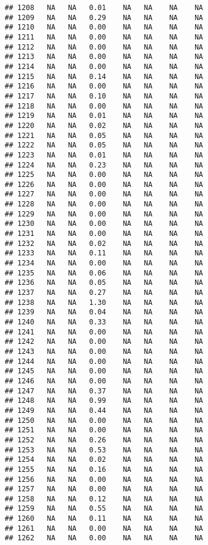 \documentclass{article}\usepackage{graphicx, color}
\makeatletter
\newenvironment{kframe}{%
 \def\at@end@of@kframe{}%
 \ifinner\ifhmode%
  \def\at@end@of@kframe{\end{minipage}}%
  \begin{minipage}{\columnwidth}%
 \fi\fi%
 \def\FrameCommand##1{\hskip\@totalleftmargin \hskip-\fboxsep
 \colorbox{shadecolor}{##1}\hskip-\fboxsep
     \hskip-\linewidth \hskip-\@totalleftmargin \hskip\columnwidth}%
 \MakeFramed {\advance\hsize-\width
   \@totalleftmargin\z@ \linewidth\hsize
   \@setminipage}}%
 {\par\unskip\endMakeFramed%
 \at@end@of@kframe}
\newenvironment{knitrout}{}{} %
\makeatother
\begin{document}
\begin{knitrout}
\begin{kframe}
\begin{verbatim}
## 1208   NA   NA   0.01    NA   NA    NA    NA
## 1209   NA   NA   0.29    NA   NA    NA    NA
## 1210   NA   NA   0.00    NA   NA    NA    NA
## 1211   NA   NA   0.00    NA   NA    NA    NA
## 1212   NA   NA   0.00    NA   NA    NA    NA
## 1213   NA   NA   0.00    NA   NA    NA    NA
## 1214   NA   NA   0.00    NA   NA    NA    NA
## 1215   NA   NA   0.14    NA   NA    NA    NA
## 1216   NA   NA   0.00    NA   NA    NA    NA
## 1217   NA   NA   0.10    NA   NA    NA    NA
## 1218   NA   NA   0.00    NA   NA    NA    NA
## 1219   NA   NA   0.01    NA   NA    NA    NA
## 1220   NA   NA   0.02    NA   NA    NA    NA
## 1221   NA   NA   0.05    NA   NA    NA    NA
## 1222   NA   NA   0.05    NA   NA    NA    NA
## 1223   NA   NA   0.01    NA   NA    NA    NA
## 1224   NA   NA   0.23    NA   NA    NA    NA
## 1225   NA   NA   0.00    NA   NA    NA    NA
## 1226   NA   NA   0.00    NA   NA    NA    NA
## 1227   NA   NA   0.00    NA   NA    NA    NA
## 1228   NA   NA   0.00    NA   NA    NA    NA
## 1229   NA   NA   0.00    NA   NA    NA    NA
## 1230   NA   NA   0.00    NA   NA    NA    NA
## 1231   NA   NA   0.00    NA   NA    NA    NA
## 1232   NA   NA   0.02    NA   NA    NA    NA
## 1233   NA   NA   0.11    NA   NA    NA    NA
## 1234   NA   NA   0.00    NA   NA    NA    NA
## 1235   NA   NA   0.06    NA   NA    NA    NA
## 1236   NA   NA   0.05    NA   NA    NA    NA
## 1237   NA   NA   0.27    NA   NA    NA    NA
## 1238   NA   NA   1.30    NA   NA    NA    NA
## 1239   NA   NA   0.04    NA   NA    NA    NA
## 1240   NA   NA   0.33    NA   NA    NA    NA
## 1241   NA   NA   0.00    NA   NA    NA    NA
## 1242   NA   NA   0.00    NA   NA    NA    NA
## 1243   NA   NA   0.00    NA   NA    NA    NA
## 1244   NA   NA   0.00    NA   NA    NA    NA
## 1245   NA   NA   0.00    NA   NA    NA    NA
## 1246   NA   NA   0.00    NA   NA    NA    NA
## 1247   NA   NA   0.37    NA   NA    NA    NA
## 1248   NA   NA   0.99    NA   NA    NA    NA
## 1249   NA   NA   0.44    NA   NA    NA    NA
## 1250   NA   NA   0.00    NA   NA    NA    NA
## 1251   NA   NA   0.00    NA   NA    NA    NA
## 1252   NA   NA   0.26    NA   NA    NA    NA
## 1253   NA   NA   0.53    NA   NA    NA    NA
## 1254   NA   NA   0.02    NA   NA    NA    NA
## 1255   NA   NA   0.16    NA   NA    NA    NA
## 1256   NA   NA   0.00    NA   NA    NA    NA
## 1257   NA   NA   0.00    NA   NA    NA    NA
## 1258   NA   NA   0.12    NA   NA    NA    NA
## 1259   NA   NA   0.55    NA   NA    NA    NA
## 1260   NA   NA   0.11    NA   NA    NA    NA
## 1261   NA   NA   0.00    NA   NA    NA    NA
## 1262   NA   NA   0.00    NA   NA    NA    NA

\end{verbatim}
\end{kframe}
\end{knitrout}
\end{document}
